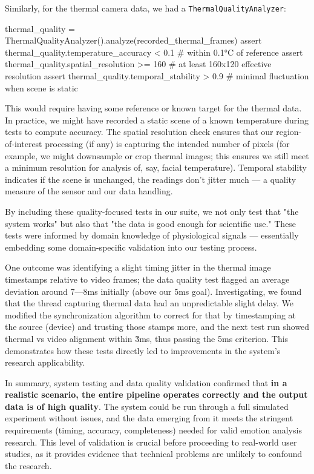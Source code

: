 \documentclass[11pt,a4paper]{report}
\begin{document}
Similarly, for the thermal camera data, we had a
\texttt{ThermalQualityAnalyzer}:

    thermal\_quality = ThermalQualityAnalyzer().analyze(recorded\_thermal\_frames)
    assert thermal\_quality.temperature\_accuracy < 0.1  # within 0.1°C of reference
    assert thermal\_quality.spatial\_resolution >= 160   # at least 160x120 effective resolution
    assert thermal\_quality.temporal\_stability > 0.9    # minimal fluctuation when scene is static

This would require having some reference or known target for the thermal
data. In practice, we might have recorded a static scene of a known
temperature during tests to compute accuracy. The spatial resolution
check ensures that our region-of-interest processing (if any) is
capturing the intended number of pixels (for example, we might
downsample or crop thermal images; this ensures we still meet a minimum
resolution for analysis of, say, facial temperature). Temporal stability
 indicates if the scene is unchanged, the readings don't jitter
much --- a quality measure of the sensor and our data handling.

By including these quality-focused tests in our suite, we not only test
that "the system works" but also that "the data is good enough for
scientific use." These tests were informed by domain knowledge of
physiological signals --- essentially embedding some domain-specific
validation into our testing process.

One outcome was identifying a slight timing jitter in the thermal image
timestamps relative to video frames; the data quality test flagged an
average deviation around 7---8ms initially (above our 5ms goal).
Investigating, we found that the thread capturing thermal data had an
unpredictable slight delay. We modified the synchronization algorithm to
correct for that by timestamping at the source (device) and trusting
those stamps more, and the next test run showed thermal vs video
alignment within \~3ms, thus passing the \<5ms criterion. This
demonstrates how these tests directly led to improvements in the
system's research applicability.

In summary, system testing and data quality validation confirmed that
\textbf{in a realistic scenario, the entire pipeline operates correctly and
the output data is of high quality}. The system could be run through a
full simulated experiment without issues, and the data emerging from it
meets the stringent requirements (timing, accuracy, completeness) needed
for valid emotion analysis research. This level of validation is crucial
before proceeding to real-world user studies, as it provides evidence
that technical problems are unlikely to confound the research.
\end{document}
